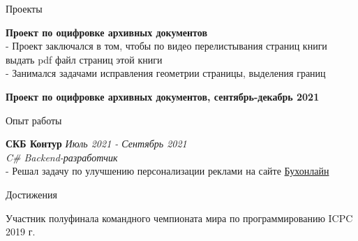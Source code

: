 \documentclass{resume} %
\begin{document}
\begin{rSection}{Проекты}

\item{\bf Проект по оцифровке архивных документов}
\\-  Проект заключался в том, чтобы по видео перелистывания страниц книги выдать pdf файл страниц этой книги
\\- Занимался задачами исправления геометрии страницы, выделения границ

{\bf Проект по оцифровке архивных документов, сентябрь-декабрь 2021}
\end{rSection}


\begin{rSection}{Опыт работы}

{\bf СКБ Контур } \hfill {\em Июль 2021 - Сентябрь 2021} \\
{\textit{C\# Backend-разработчик}}\\
- Решал задачу по улучшению персонализации реклами на сайте \href{https://www.buhonline.ru/}{Бухонлайн}




\end{rSection}


\begin{rSection}{Достижения}
\item Участник полуфинала командного чемпионата мира по программированию ICPC 2019 г.
\end{rSection}
\end{document}
